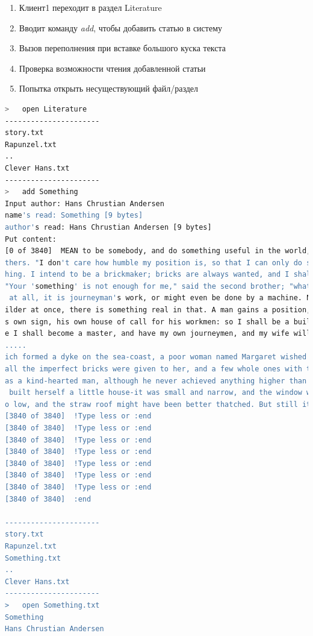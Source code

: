 \documentclass[12pt,a4paper]{report}
\begin{document}
\begin{enumerate}
\item Клиент1 переходит в раздел Literature
\item Вводит команду \textit{add}, чтобы добавить статью в систему 
\item Вызов переполнения при вставке большого куска текста
\item Проверка  возможности чтения добавленной статьи
\item Попытка открыть несуществующий файл/раздел
\end{enumerate}
\begin{lstlisting}[language=sh]
>   open Literature
----------------------
story.txt
Rapunzel.txt
..
Clever Hans.txt
----------------------
>   add Something
Input author: Hans Chrustian Andersen
name's read: Something [9 bytes]
author's read: Hans Chrustian Andersen [9 bytes]
Put content:
[0 of 3840]  MEAN to be somebody, and do something useful in the world," said the eldest of five bro
thers. "I don't care how humble my position is, so that I can only do some good, which will be somet
hing. I intend to be a brickmaker; bricks are always wanted, and I shall be really doing something."
"Your 'something' is not enough for me," said the second brother; "what you talk of doing is nothing
 at all, it is journeyman's work, or might even be done by a machine. No! I should prefer to be a bu
ilder at once, there is something real in that. A man gains a position, he becomes a citizen, has hi
s own sign, his own house of call for his workmen: so I shall be a builder. If all goes well, in tim
e I shall become a master, and have my own journeymen, and my wife will be treated as a master's wif
.....
ich formed a dyke on the sea-coast, a poor woman named Margaret wished to build herself a house, so
all the imperfect bricks were given to her, and a few whole ones with them; for the eldest brother w
as a kind-hearted man, although he never achieved anything higher than making bricks. The poor woman
 built herself a little house-it was small and narrow, and the window was quite crooked, the door to
o low, and the straw roof might have been better thatched. But still it was a shelter, and from with
[3840 of 3840]  !Type less or :end
[3840 of 3840]  !Type less or :end
[3840 of 3840]  !Type less or :end
[3840 of 3840]  !Type less or :end
[3840 of 3840]  !Type less or :end
[3840 of 3840]  !Type less or :end
[3840 of 3840]  !Type less or :end
[3840 of 3840]  :end

----------------------
story.txt
Rapunzel.txt
Something.txt
..
Clever Hans.txt
----------------------
>   open Something.txt
Something
Hans Chrustian Andersen


\end{lstlisting}
\end{document}
